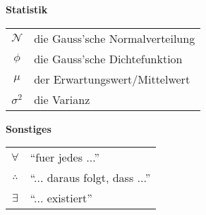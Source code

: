 \begin{center}\textbf{Statistik}\end{center}
\begin{tabular}{cl}
  $\mathcal{N}$ & die Gauss'sche Normalverteilung \\
  $\phi$ & die Gauss'sche Dichtefunktion \\
  $\mu$ & der Erwartungswert/Mittelwert \\
  $\sigma^2$ & die Varianz
\end{tabular}

\begin{center}\textbf{Sonstiges}\end{center}
\begin{tabular}{cl}
  $\forall$ & ``fuer jedes ...'' \\
  $\therefore$ & ``... daraus folgt, dass ...'' \\
  $\exists$ & ``... existiert'' \\
\end{tabular}



